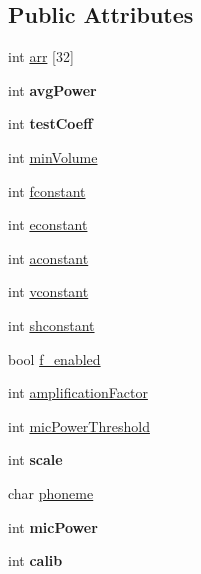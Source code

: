 \subsection*{Public Attributes}
\begin{DoxyCompactItemize}
\item 
int \hyperlink{classsignal_a3e2d5027e6570321f8d1a823b0d47af0}{arr} \mbox{[}32\mbox{]}
\item 
\hypertarget{classsignal_ab32b590e3f68d6365187bfc2548e9a45}{int {\bfseries avg\-Power}}\label{classsignal_ab32b590e3f68d6365187bfc2548e9a45}

\item 
\hypertarget{classsignal_aeaf455f095f4d8f60aac5d0b7ba4cbf6}{int {\bfseries test\-Coeff}}\label{classsignal_aeaf455f095f4d8f60aac5d0b7ba4cbf6}

\item 
int \hyperlink{classsignal_a4604a8a9760752f00af96457a34debf9}{min\-Volume}
\item 
int \hyperlink{classsignal_ae256fa87a2b25841cda3155d0519172c}{fconstant}
\item 
int \hyperlink{classsignal_aa346a5acfecf429893ab85bc4a903875}{econstant}
\item 
int \hyperlink{classsignal_ad300e73d67f1870bbbc5cfcece5910ec}{aconstant}
\item 
int \hyperlink{classsignal_ad717d6555e102392063d04affb78b95d}{vconstant}
\item 
int \hyperlink{classsignal_a6697308a69e450ec5322b8438a442b36}{shconstant}
\item 
bool \hyperlink{classsignal_aaecf78836054e8f13a6caaf340d0b3c9}{f\-\_\-enabled}
\item 
int \hyperlink{classsignal_a16d895fcf95efa3327fd7342f7bde145}{amplification\-Factor}
\item 
int \hyperlink{classsignal_a052c94e3579fe8145fa6a891bd11f9ab}{mic\-Power\-Threshold}
\item 
\hypertarget{classsignal_a76a47066201e88a1d433ffb84213aed6}{int {\bfseries scale}}\label{classsignal_a76a47066201e88a1d433ffb84213aed6}

\item 
char \hyperlink{classsignal_aea8e52b903d491e25065ac261139edd2}{phoneme}
\item 
\hypertarget{classsignal_ab8922a2b87023df6deab895d1dcccdc9}{int {\bfseries mic\-Power}}\label{classsignal_ab8922a2b87023df6deab895d1dcccdc9}

\item 
\hypertarget{classsignal_adc1016eb7876044eaadbd3023e2f4f70}{int {\bfseries calib}}\label{classsignal_adc1016eb7876044eaadbd3023e2f4f70}

\end{DoxyCompactItemize}


